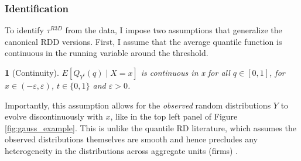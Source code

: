 \documentclass[12pt]{article}
\newtheorem{assumpI}{}
\begin{document}
\subsubsection{Identification}

To identify $\tau^{R3D}$ from the data, I impose two assumptions that generalize the canonical RDD versions. 
First, I assume that the average quantile function is continuous in the running variable around the threshold.
\begin{assumpI}[Continuity] \label{asspt:i_cont}
$E[Q_{Y^t}(q) \mid X=x]$ is continuous in x for all $q \in [0,1]$, for $x \in (-\varepsilon, \varepsilon)$, $t \in \{0,1\}$ and $\varepsilon > 0$.
\end{assumpI}
Importantly, this assumption allows for the \textit{observed} random distributions $Y$ to evolve discontinuously with $x$, like in the top left panel of Figure \ref{fig:gauss_example}. This is unlike the quantile RD literature, which assumes the observed distributions themselves are smooth and hence precludes any heterogeneity in the distributions across aggregate units (firms) \citep{frandsen2012quantile}.
 
\end{document}
